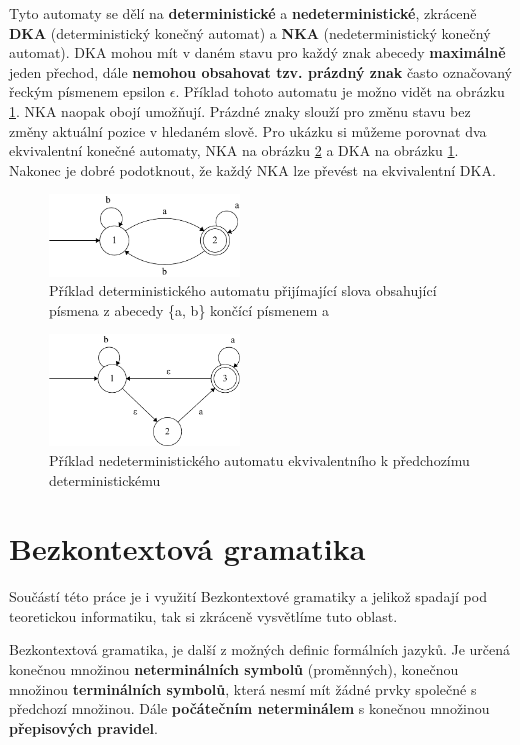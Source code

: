 Tyto automaty se dělí na \textbf{deterministické} a \textbf{nedeterministické}, zkráceně \textbf{DKA} (deterministický konečný automat) a \textbf{NKA} (nedeterministický konečný automat).
DKA mohou mít v daném stavu pro každý znak abecedy \textbf{maximálně} jeden přechod, dále \textbf{nemohou obsahovat tzv. prázdný znak} často označovaný řeckým písmenem epsilon $\epsilon$.
Příklad tohoto automatu je možno vidět na obrázku \ref{fig:DFAex}.
NKA naopak obojí umožňují. 
Prázdné znaky slouží pro změnu stavu bez změny aktuální pozice v hledaném slově. 
Pro ukázku si můžeme porovnat dva ekvivalentní konečné automaty,
NKA na obrázku \ref{fig:NFAex} a DKA na obrázku \ref{fig:DFAex}.
Nakonec je dobré podotknout, že každý NKA lze převést na ekvivalentní DKA.

\begin{figure}[!h]
	\centering
	\includegraphics[width=0.45\textwidth]{Figures/DFA_example.pdf}
	\caption{Příklad deterministického automatu přijímající slova obsahující písmena z abecedy \{a, b\} končící písmenem a}
	\label{fig:DFAex}
\end{figure}

\begin{figure}[!h]
	\centering
	\includegraphics[width=0.45\textwidth]{Figures/NFA_example.pdf}
	\caption{Příklad nedeterministického automatu ekvivalentního k předchozímu deterministickému}
	\label{fig:NFAex}
\end{figure}

\section{Bezkontextová gramatika}
Součástí této práce je i využití Bezkontextové gramatiky a jelikož spadají pod teoretickou informatiku, 
tak si zkráceně vysvětlíme tuto oblast.

Bezkontextová gramatika, je další z možných definic formálních jazyků. Je určená konečnou množinou \textbf{neterminálních symbolů} (proměnných), konečnou množinou \textbf{terminálních symbolů}, která nesmí mít žádné prvky společné s předchozí množinou.
Dále \textbf{počátečním neterminálem} s konečnou množinou \textbf{přepisových pravidel}\cite{MUNIFL}.

